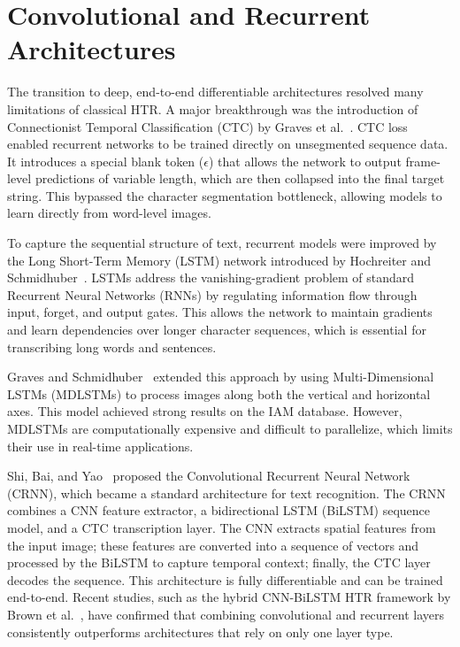 \section{Convolutional and Recurrent Architectures}
The transition to deep, end-to-end differentiable architectures resolved many limitations of classical HTR. A major breakthrough was the introduction of Connectionist Temporal Classification (CTC) by Graves et al.~\cite{graves2006connectionist}. CTC loss enabled recurrent networks to be trained directly on unsegmented sequence data. It introduces a special blank token ($\epsilon$) that allows the network to output frame-level predictions of variable length, which are then collapsed into the final target string. This bypassed the character segmentation bottleneck, allowing models to learn directly from word-level images.

To capture the sequential structure of text, recurrent models were improved by the Long Short-Term Memory (LSTM) network introduced by Hochreiter and Schmidhuber~\cite{hochreiter1997long}. LSTMs address the vanishing-gradient problem of standard Recurrent Neural Networks (RNNs) by regulating information flow through input, forget, and output gates. This allows the network to maintain gradients and learn dependencies over longer character sequences, which is essential for transcribing long words and sentences.

Graves and Schmidhuber~\cite{graves2009offline} extended this approach by using Multi-Dimensional LSTMs (MDLSTMs) to process images along both the vertical and horizontal axes. This model achieved strong results on the IAM database. However, MDLSTMs are computationally expensive and difficult to parallelize, which limits their use in real-time applications.

Shi, Bai, and Yao~\cite{shi2017end} proposed the Convolutional Recurrent Neural Network (CRNN), which became a standard architecture for text recognition. The CRNN combines a CNN feature extractor, a bidirectional LSTM (BiLSTM) sequence model, and a CTC transcription layer. The CNN extracts spatial features from the input image; these features are converted into a sequence of vectors and processed by the BiLSTM to capture temporal context; finally, the CTC layer decodes the sequence. This architecture is fully differentiable and can be trained end-to-end. Recent studies, such as the hybrid CNN-BiLSTM HTR framework by Brown et al.~\cite{study2023hybrid}, have confirmed that combining convolutional and recurrent layers consistently outperforms architectures that rely on only one layer type.

